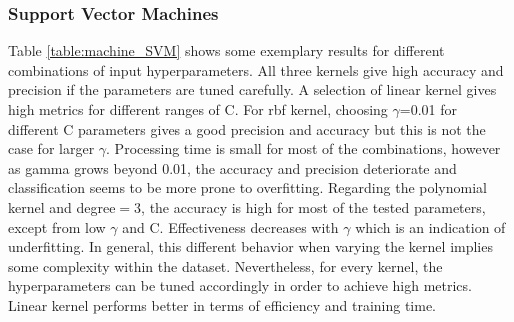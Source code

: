 \documentclass{article}
\begin{document}
\subsubsection*{Support Vector Machines}
Table \ref{table:machine_SVM} shows some exemplary results for different combinations of input hyperparameters. All three kernels give high accuracy and precision if the parameters are tuned carefully. A selection of linear kernel gives high metrics for different ranges of C. For rbf kernel, choosing $\gamma$=0.01 for different C parameters gives a good precision and accuracy but this is not the case for larger $\gamma$. Processing time is small for most of the combinations, however as gamma grows beyond 0.01, the accuracy and precision deteriorate and classification seems to be more prone to overfitting. Regarding the polynomial kernel and degree$=$3, the accuracy is high for most of the tested parameters, except from low $\gamma$ and C. Effectiveness decreases with $\gamma$ which is an indication of underfitting. In general, this different behavior when varying the kernel implies some complexity within the dataset. Nevertheless, for every kernel, the hyperparameters can be tuned accordingly in order to achieve high metrics. Linear kernel performs better in terms of efficiency and training time.
\end{document}
